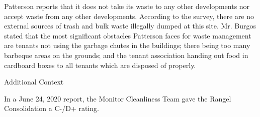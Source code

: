 Patterson reports that it does not take its waste to any other developments nor accept waste from any other developments. According to the survey,  there are no external sources of trash and bulk waste illegally dumped at this site. Mr. Burgos stated that the most significant obstacles Patterson faces for waste management are tenants not using the garbage chutes in the buildings; there being too many barbeque areas on the grounds; and the tenant association handing out food in cardboard boxes to all tenants which are disposed of properly.



Additional Context 



In a June 24, 2020 report, the Monitor Cleanliness Team gave the Rangel Consolidation a C-/D+ rating.
